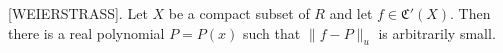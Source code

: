 [WEIERSTRASS]. Let $X$ be a compact subset of $R$ and let $f \in \mathfrak{C}'(X)$. Then there is a real polynomial $P = P(x)$ such that $\|f - P\|_u$ is arbitrarily small.